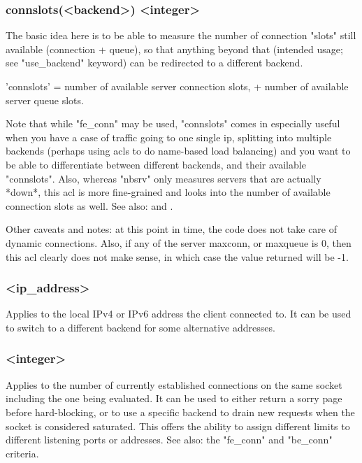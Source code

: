 \subsubsection*{connslots(<backend>) <integer>}
  The basic idea here is to be able to measure the number of connection "slots"
  still available (connection + queue), so that anything beyond that (intended
  usage; see "use\_backend" keyword) can be redirected to a different backend.

  'connslots' = number of available server connection slots, + number of
  available server queue slots.

  Note that while "fe\_conn" may be used, "connslots" comes in especially
  useful when you have a case of traffic going to one single ip, splitting into
  multiple backends (perhaps using acls to do name-based load balancing) and
  you want to be able to differentiate between different backends, and their
  available "connslots".  Also, whereas "nbsrv" only measures servers that are
  actually *down*, this acl is more fine-grained and looks into the number of
  available connection slots as well. See also:  and .

  \begin{note}{Other caveats and notes:} at this point in time, the code does not take care
  of dynamic connections. Also, if any of the server maxconn, or maxqueue is 0,
  then this acl clearly does not make sense, in which case the value returned
  will be -1.
  \end{note}

\subsubsection[dst]{ <ip\_address>}
  Applies to the local IPv4 or IPv6 address the client connected to. It can be
  used to switch to a different backend for some alternative addresses.

\subsubsection[dst\_conn]{ <integer>}
  Applies to the number of currently established connections on the same socket
  including the one being evaluated. It can be used to either return a sorry
  page before hard-blocking, or to use a specific backend to drain new requests
  when the socket is considered saturated. This offers the ability to assign
  different limits to different listening ports or addresses. See also: the
  "fe\_conn" and "be\_conn" criteria.

